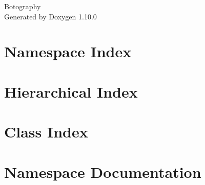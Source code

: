 \documentclass[twoside]{book}
\newcommand{\+}{\discretionary{\mbox{\scriptsize$\hookleftarrow$}}{}{}}
\newcommand{\clearemptydoublepage}{%
    \newpage{\pagestyle{empty}\cleardoublepage}%
  }
\begin{document}
  \raggedbottom
    \hypersetup{pageanchor=false,
                bookmarksnumbered=true,
                pdfencoding=unicode
               }
  \begin{titlepage}
  \vspace*{7cm}
  \begin{center}%
  {\Large Botography}\\
  \vspace*{1cm}
  {\large Generated by Doxygen 1.10.0}\\
  \end{center}
  \end{titlepage}
  \clearemptydoublepage
  \tableofcontents
  \clearemptydoublepage
  \hypersetup{pageanchor=true}
\chapter{Namespace Index}

\chapter{Hierarchical Index}

\chapter{Class Index}

\chapter{Namespace Documentation}











\end{document}
